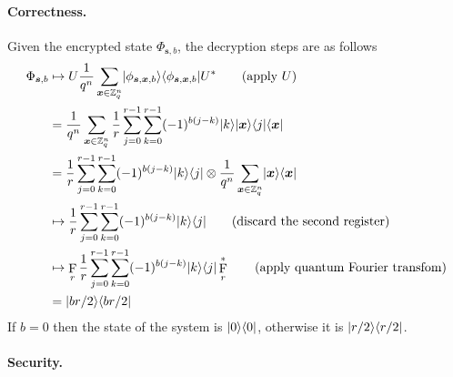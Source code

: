 \documentclass[11pt]{article}
\theoremstyle{plain}
\theoremstyle{definition}
\DeclareMathOperator{\qft}{F}
\DeclarePairedDelimiter{\ldbrac}{\lvert}{\rangle}
\DeclarePairedDelimiter{\rdbrac}{\langle}{\rvert}
\def\Z{\ensuremath{\mathbb{Z}}}
\begin{document}
\paragraph{Correctness.} 
Given the encrypted state $\Phi_{\bm{s}, b}$, the decryption steps are as follows
\begin{align*}
    \Phi_{\bm{s}, b}
    & \mapsto U \frac{1}{q^n} \sum_{\bm{x} \in \Z_q^n} \ldbrac{\phi_{\bm{s}, \bm{x}, b}} \rdbrac{\phi_{\bm{s}, \bm{x}, b}} U^*  \tag{apply $U$} \\
    & = \frac{1}{q^n} \sum_{\bm{x} \in \Z_q^n} \frac{1}{r} \sum_{j = 0}^{r - 1} \sum_{k = 0}^{r - 1} (-1)^{b(j - k)}\ldbrac{k}\ldbrac{\bm{x}} \rdbrac{j}\rdbrac{\bm{x}} \\
    & = \frac{1}{r} \sum_{j = 0}^{r - 1} \sum_{k = 0}^{r - 1} (-1)^{b(j - k)}\ldbrac{k}\rdbrac{j} \otimes \frac{1}{q^n} \sum_{\bm{x} \in \Z_q^n} \ldbrac{\bm{x}}\rdbrac{\bm{x}} \\
    & \mapsto \frac{1}{r} \sum_{j = 0}^{r - 1} \sum_{k = 0}^{r - 1} (-1)^{b(j - k)}\ldbrac{k}\rdbrac{j} \tag{discard the second register} \\
    & \mapsto \qft_r \frac{1}{r} \sum_{j = 0}^{r - 1} \sum_{k = 0}^{r - 1} (-1)^{b(j - k)}\ldbrac{k}\rdbrac{j} \qft_r^* \tag{apply quantum Fourier transfom}\\
    & = \ldbrac{br/2} \rdbrac{br/2}
\end{align*}
If $b = 0$ then the state of the system is $\ldbrac{0} \rdbrac{0}$, otherwise it is $\ldbrac{r / 2} \rdbrac{r / 2}$. 

\paragraph{Security.}




\end{document}
